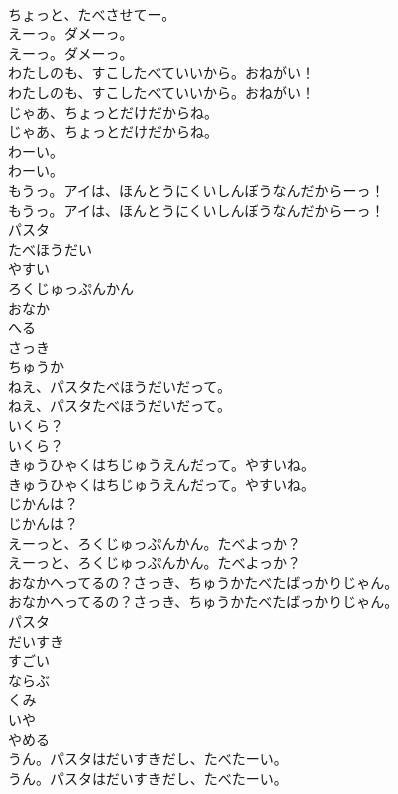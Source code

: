 \documentclass[8pt]{extreport}
\begin{document}
\begin{CJK}{UTF8}{min}
\\	ちょっと、たべさせてー。
\\	えーっ。ダメーっ。
\\	えーっ。ダメーっ。
\\	わたしのも、すこしたべていいから。おねがい！
\\	わたしのも、すこしたべていいから。おねがい！
\\	じゃあ、ちょっとだけだからね。
\\	じゃあ、ちょっとだけだからね。
\\	わーい。
\\	わーい。
\\	もうっ。アイは、ほんとうにくいしんぼうなんだからーっ！
\\	もうっ。アイは、ほんとうにくいしんぼうなんだからーっ！
\\	パスタ
\\	たべほうだい
\\	やすい
\\	ろくじゅっぷんかん
\\	おなか
\\	へる
\\	さっき
\\	ちゅうか
\\	ねえ、パスタたべほうだいだって。
\\	ねえ、パスタたべほうだいだって。
\\	いくら？
\\	いくら？
\\	きゅうひゃくはちじゅうえんだって。やすいね。
\\	きゅうひゃくはちじゅうえんだって。やすいね。
\\	じかんは？
\\	じかんは？
\\	えーっと、ろくじゅっぷんかん。たべよっか？
\\	えーっと、ろくじゅっぷんかん。たべよっか？
\\	おなかへってるの？さっき、ちゅうかたべたばっかりじゃん。
\\	おなかへってるの？さっき、ちゅうかたべたばっかりじゃん。
\\	パスタ
\\	だいすき
\\	すごい
\\	ならぶ
\\	くみ
\\	いや
\\	やめる
\\	うん。パスタはだいすきだし、たべたーい。
\\	うん。パスタはだいすきだし、たべたーい。

\end{CJK}
\end{document}

